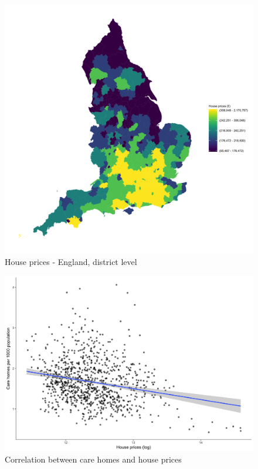 \documentclass[12pt,letterpaper]{article}
\begin{document}
\newpage

\begin{figure}[]
\includegraphics[width=1\textwidth]{map_price.png}
\caption{House prices - England, district level}
\label{fig: map house price}
\end{figure}




\newpage

\begin{figure}[h!]
\includegraphics[width=1\textwidth]{corr_prices_carehomes.png}
\caption{Correlation between care homes and house prices}
\label{fig: carehomes_prices}
\end{figure}
\end{document}
